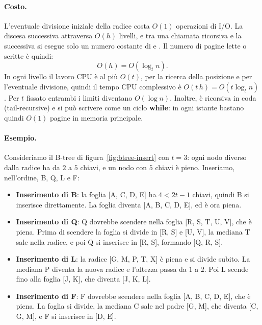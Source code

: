 \paragraph{Costo.}
L'eventuale divisione iniziale della radice costa $O(1)$ operazioni di I/O. La discesa successiva attraversa $O(h)$ livelli, e tra una chiamata ricorsiva e la successiva si esegue solo un numero costante di \PageRead{} e \PageWrite{}. Il numero di pagine lette o scritte è quindi:
\[
O(h) = O(\log_t n).
\]
In ogni livello il lavoro CPU è al più $O(t)$, per la ricerca della posizione e per l'eventuale divisione, quindi il tempo CPU complessivo è $O(t\,h) = O(t\log_t n)$. Per $t$ fissato entrambi i limiti diventano $O(\log n)$. Inoltre, \BTreeInsertNonfull{} è ricorsiva in coda (tail-recursive) e si può scrivere come un ciclo \textbf{while}: in ogni istante bastano quindi $O(1)$ pagine in memoria principale.

\paragraph{Esempio.}
Consideriamo il B-tree di figura~\ref{fig:btree-insert} con $t = 3$: ogni nodo diverso dalla radice ha da $2$ a $5$ chiavi, e un nodo con $5$ chiavi è pieno. Inseriamo, nell'ordine, B, Q, L e F:
\begin{itemize}
    \item \textbf{Inserimento di B}: la foglia [A, C, D, E] ha $4 < 2t-1$ chiavi, quindi B si inserisce direttamente. La foglia diventa [A, B, C, D, E], ed è ora piena.
    \item \textbf{Inserimento di Q}: Q dovrebbe scendere nella foglia [R, S, T, U, V], che è piena. Prima di scendere la foglia si divide in [R, S] e [U, V], la mediana T sale nella radice, e poi Q si inserisce in [R, S], formando [Q, R, S].
    \item \textbf{Inserimento di L}: la radice [G, M, P, T, X] è piena e si divide subito. La mediana P diventa la nuova radice e l'altezza passa da $1$ a $2$. Poi L scende fino alla foglia [J, K], che diventa [J, K, L].
    \item \textbf{Inserimento di F}: F dovrebbe scendere nella foglia [A, B, C, D, E], che è piena. La foglia si divide, la mediana C sale nel padre [G, M], che diventa [C, G, M], e F si inserisce in [D, E].
\end{itemize}

